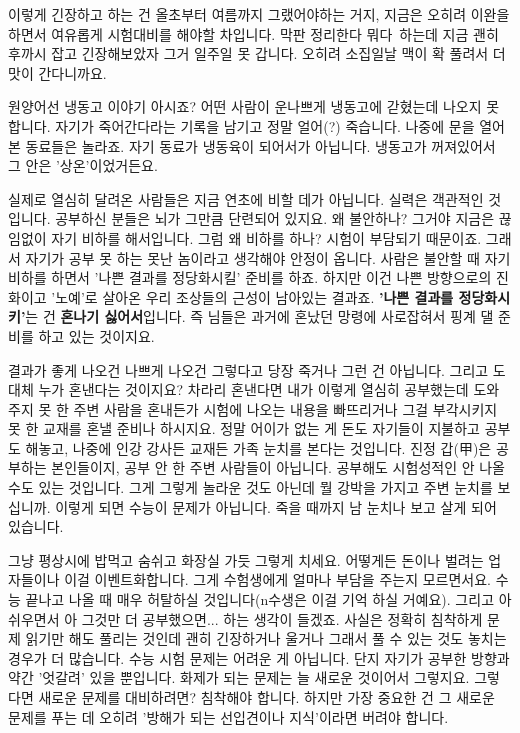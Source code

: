 이렇게 긴장하고 하는 건 올초부터 여름까지 그랬어야하는 거지, 지금은 오히려 이완을 하면서 여유롭게 시험대비를 해야할 차입니다.
막판 정리한다 뭐다 하는데 지금 괜히 후까시 잡고 긴장해보았자 그거 일주일 못 갑니다. 오히려 소집일날 맥이 확 풀려서 더 맛이 간다니까요.
\vspace{5mm}

원양어선 냉동고 이야기 아시죠?
어떤 사람이 운나쁘게 냉동고에 갇혔는데 나오지 못 합니다.
자기가 죽어간다라는 기록을 남기고 정말 얼어(?) 죽습니다.
나중에 문을 열어본 동료들은 놀라죠.
자기 동료가 냉동육이 되어서가 아닙니다.
냉동고가 꺼져있어서 그 안은 '상온'이었거든요.
\vspace{5mm}

실제로 열심히 달려온 사람들은 지금 연초에 비할 데가 아닙니다.
실력은 객관적인 것입니다. 공부하신 분들은 뇌가 그만큼 단련되어 있지요.
왜 불안하나? 그거야 지금은 끊임없이 자기 비하를 해서입니다.
그럼 왜 비하를 하나? 시험이 부담되기 때문이죠. 그래서 자기가 공부 못 하는 못난 놈이라고 생각해야 안정이 옵니다.
사람은 불안할 때 자기 비하를 하면서 '나쁜 결과를 정당화시킬' 준비를 하죠.
하지만 이건 나쁜 방향으로의 진화이고 '노예'로 살아온 우리 조상들의 근성이 남아있는 결과죠.
\textbf{'나쁜 결과를 정당화시키'}는 건 \textbf{혼나기 싫어서}입니다. 즉 님들은 과거에 혼났던 망령에 사로잡혀서 핑계 댈 준비를 하고 있는 것이지요.
\vspace{5mm}

결과가 좋게 나오건 나쁘게 나오건 그렇다고 당장 죽거나 그런 건 아닙니다. 그리고 도대체 누가 혼낸다는 것이지요?
차라리 혼낸다면 내가 이렇게 열심히 공부했는데 도와주지 못 한 주변 사람을 혼내든가
시험에 나오는 내용을 빠뜨리거나 그걸 부각시키지 못 한 교재를 혼낼 준비나 하시지요.
정말 어이가 없는 게 돈도 자기들이 지불하고 공부도 해놓고, 나중에 인강 강사든 교재든 가족 눈치를 본다는 것입니다.
진정 갑(甲)은 공부하는 본인들이지, 공부 안 한 주변 사람들이 아닙니다.
공부해도 시험성적인 안 나올 수도 있는 것입니다. 그게 그렇게 놀라운 것도 아닌데 뭘 강박을 가지고 주변 눈치를 보십니까.
이렇게 되면 수능이 문제가 아닙니다. 죽을 때까지 남 눈치나 보고 살게 되어 있습니다.
\vspace{5mm}

그냥 평상시에 밥먹고 숨쉬고 화장실 가듯 그렇게 치세요.
어떻게든 돈이나 벌려는 업자들이나 이걸 이벤트화합니다. 그게 수험생에게 얼마나 부담을 주는지 모르면서요.
수능 끝나고 나올 때 매우 허탈하실 것입니다(n수생은 이걸 기억 하실 거예요). 그리고 아쉬우면서 아 그것만 더 공부했으면... 하는 생각이 들겠죠.
사실은 정확히 침착하게 문제 읽기만 해도 풀리는 것인데 괜히 긴장하거나 울거나 그래서 풀 수 있는 것도 놓치는 경우가 더 많습니다.
수능 시험 문제는 어려운 게 아닙니다. 단지 자기가 공부한 방향과 약간 '엇갈려' 있을 뿐입니다.
화제가 되는 문제는 늘 새로운 것이어서 그렇지요. 그렇다면 새로운 문제를 대비하려면? 침착해야 합니다.
하지만 가장 중요한 건 그 새로운 문제를 푸는 데 오히려 '방해가 되는 선입견이나 지식'이라면 버려야 합니다.
\vspace{5mm}

